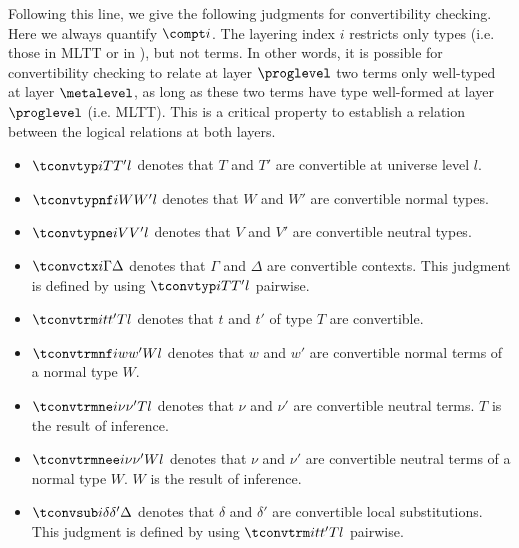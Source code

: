 Following this line, we give the following judgments for convertibility checking. %
Here we always quantify $\compt i$. %
The layering index $i$ restricts only types (i.e. those in MLTT or in \delamlang), but
not terms. %
In other words, it is possible for convertibility checking to relate at layer $\proglevel$ two
terms only well-typed at layer $\metalevel$, as long as these two terms have type well-formed
at layer $\proglevel$ (i.e. MLTT). %
This is a critical property to establish a relation between the logical relations at
both layers. %
\begin{itemize}
\item $\tconvtyp i T{T'} l$ denotes that $T$ and $T'$ are convertible at universe level $l$. 
\item $\tconvtypnf i W{W'} l$ denotes that $W$ and $W'$ are convertible normal types.
\item $\tconvtypne i V{V'}l$ denotes that $V$ and $V'$ are convertible neutral types.
\item $\tconvctx i \Gamma \Delta$ denotes that $\Gamma$ and $\Delta$ are convertible contexts. %
  This judgment is defined by using $\tconvtyp i T{T'} l$ pairwise.
\item $\tconvtrm i t{t'}T l$ denotes that $t$ and $t'$ of type $T$ are convertible.
\item $\tconvtrmnf i w{w'}W l$ denotes that $w$ and $w'$ are convertible normal terms of a normal
  type $W$.
\item $\tconvtrmne i \nu{\nu'}T l$ denotes that $\nu$ and $\nu'$ are convertible
  neutral terms. %
  $T$ is the result of inference. %
\item $\tconvtrmnee i \nu{\nu'}W l$ denotes that $\nu$ and $\nu'$ are convertible neutral terms of
  a normal type $W$. %
  $W$ is the result of inference. 
\item $\tconvsub i{\delta}{\delta'}\Delta$ denotes that $\delta$ and $\delta'$ are convertible
  local substitutions. %
  This judgment is defined by using $\tconvtrm i t{t'}T l$ pairwise. 
\end{itemize}

